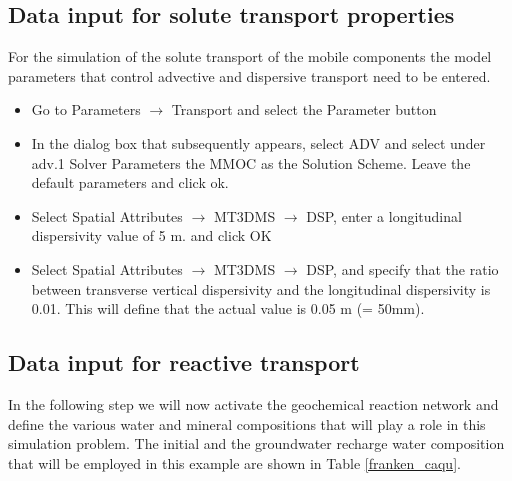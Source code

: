 
\subsection[Data input for solute transport properties]{Data input for solute transport properties}

For the simulation of the solute transport of the mobile components the model parameters that control advective and dispersive transport need to be entered. 

\begin{itemize}

\item Go to {\color{blue}Parameters} $\rightarrow$ {\color{blue}Transport} and select the {\color{blue}Parameter} button

\item In the dialog box that subsequently appears, select {\color{blue}ADV} and select under {\color{blue}adv.1 Solver Parameters} the {\color{blue}MMOC} as the Solution Scheme. Leave the default parameters and click {\color{blue}ok}.

\item Select {\color{blue}Spatial Attributes} $\rightarrow$ {\color{blue}MT3DMS} $\rightarrow$ {\color{blue}DSP}, enter a longitudinal dispersivity value of 5 m. and click {\color{blue}OK}

\item Select {\color{blue}Spatial Attributes} $\rightarrow$ {\color{blue}MT3DMS} $\rightarrow$ {\color{blue}DSP}, and specify that the ratio between transverse vertical dispersivity and the longitudinal dispersivity is 0.01.
This will define that the actual value is 0.05 m (= 50mm). 


\end{itemize}

\subsection[Data input for reactive transport]{Data input for reactive transport}

In the following step we will now activate the geochemical reaction network and define the various water and mineral compositions that will play a role in this simulation problem. The initial and the groundwater recharge water composition that will be employed in this example are shown in Table \ref{franken_caqu}. 


